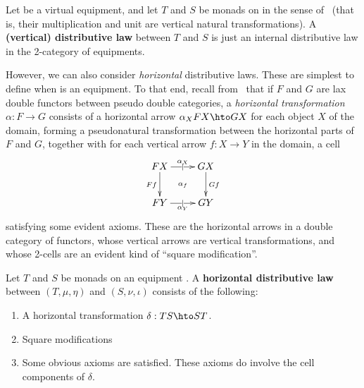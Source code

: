 \documentclass{amsart}
\newcommand{\K}{\bbK}
\begin{document}
Let \K be a virtual equipment, and let $T$ and $S$ be monads on \bbK in the sense of~\cite{cs:multicats} (that is, their multiplication and unit are vertical natural transformations).
A \textbf{(vertical) distributive law} between $T$ and $S$ is just an internal distributive law in the 2-category of equipments.

However, we can also consider \emph{horizontal} distributive laws.
These are simplest to define when \K is an equipment.
To that end, recall from~\cite{gp:something} that if $F$ and $G$ are lax double functors between pseudo double categories, a \emph{horizontal transformation} $\alpha:F\to G$ consists of a horizontal arrow $\alpha_X  F X \hto G X$ for each object $X$ of the domain, forming a pseudonatural transformation between the horizontal parts of $F$ and $G$, together with for each vertical arrow $f:X\to Y$ in the domain, a cell
\[ \xymatrix{ F X \ar[r]|-{|}^-{\alpha_X} \ar[d]_{F f} \ar@{}[dr]|{\alpha_f} & G X \ar[d]^{G f} \\
F Y \ar[r]|-{|}_-{\alpha_Y} & G Y} \]
satisfying some evident axioms.
These are the horizontal arrows in a double category of functors, whose vertical arrows are vertical transformations, and whose 2-cells are an evident kind of ``square modification''.

\begin{defn}\label{def:hdl}
  Let $T$ and $S$ be monads on an equipment \K.
  A \textbf{horizontal distributive law} between $(T,\mu,\eta)$ and $(S,\nu,\iota)$ consists of the following:
  \begin{enumerate}
    \item A horizontal transformation $\delta : T S \hto S T$.
    \item Square modifications

    \item Some obvious axioms are satisfied.
      These axioms do involve the cell components of $\delta$.
  \end{enumerate}
\end{defn}
\end{document}
